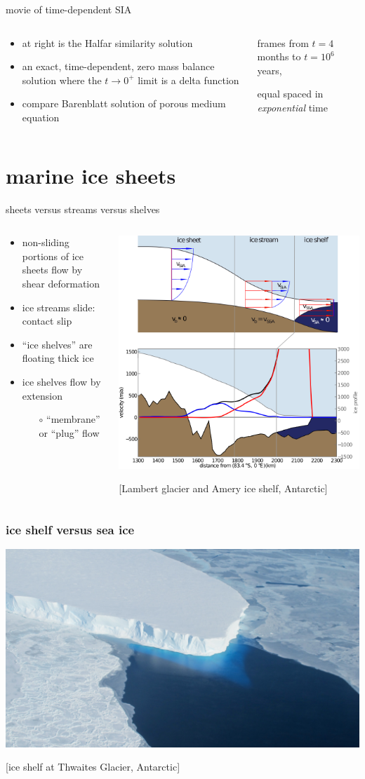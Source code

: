 \documentclass{beamer}
\newcommand{\contactslipslide}{
\begin{frame}{sheets versus streams versus shelves}

\begin{columns}
\begin{column}{0.35\textwidth}
\small
\begin{itemize}
\small
\item non-sliding portions of ice sheets flow by shear deformation
\item ice streams slide: \alert{contact slip}
\item ``ice shelves'' are floating thick ice
\item ice shelves flow by extension
  \begin{itemize}
  \scriptsize
  \item[$\circ$] ``membrane'' or ``plug'' flow
  \end{itemize}
\end{itemize}
\end{column}

\begin{column}{0.65\textwidth}
\includegraphics[width=1.1\textwidth]{siassacartoon-lambert}

\begin{center}
\vspace{-0.18in}
\tiny [Lambert glacier and Amery ice shelf, Antarctic]
\end{center}
\end{column}
\end{columns}
\end{frame}
}
\begin{document}
\begin{frame}{movie of time-dependent SIA}

\begin{columns}
\begin{column}{0.4\textwidth}
\small
\begin{itemize}
\item at right is the Halfar similarity solution
\item an exact, time-dependent, zero mass balance solution where the $t\to 0^+$ limit is a delta function
\item compare Barenblatt solution of porous medium equation
\end{itemize}
\end{column}

\begin{column}{0.65\textwidth}
\vspace{-0.25in}

\begin{center}

\bigskip
\tiny
frames from $t=4$ months to $t = 10^6$ years,

equal spaced in \emph{exponential} time
\end{center}
\end{column}
\end{columns}
\end{frame}



\section{marine ice sheets}


\contactslipslide


\begin{frame}
  \frametitle{ice shelf versus sea ice}

\begin{center}
\vspace{-0.2in}

\includegraphics[width=1.0\textwidth]{supp4rignot-small}

\medskip
\tiny [ice shelf at Thwaites Glacier, Antarctic]
\end{center}
\end{frame}
\end{document}
